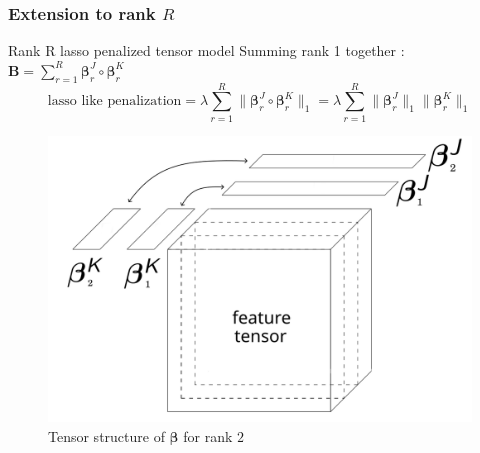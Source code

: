 \documentclass{beamer}
\begin{document}
\begin{frame}
    \frametitle{Extension to rank $R$ \cite{multi_rank_r}}
    \begin{block}{Rank R lasso penalized tensor model}
    \hspace{50 pt}Summing rank 1 together : $\mathbf{B} = \sum\limits_{r = 1}^R \bm{\beta}_{r}^J \circ \bm{\beta}_{r}^K$\\[-10 pt]
    $$ \text{lasso like penalization} =\lambda \sum\limits_{r = 1}^R  \lVert \bm{\beta}_r^J \circ \bm{\beta}_r^K \rVert_1  =  \lambda \sum\limits_{r = 1}^R\lVert \bm{\beta}_r^J \rVert_1 \lVert \bm{\beta}_r^K \rVert_1 $$
    \end{block}
    \vspace{-10 pt}
\begin{figure}
        \centering
        \includegraphics[scale=0.19]{images/beta_tens_R.png}
        \caption{Tensor structure of $\bm{\beta}$ for rank $2$}

\end{figure}

\end{frame}
\end{document}
